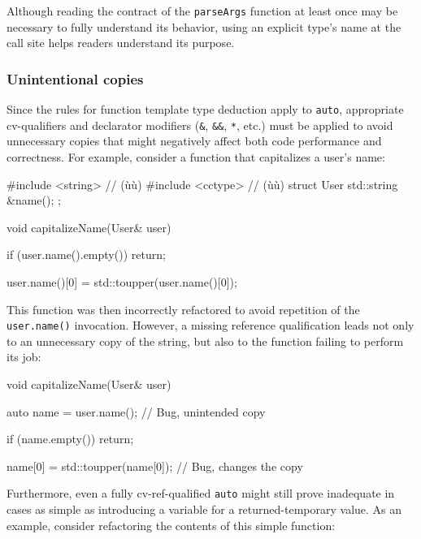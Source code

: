 \noindent Although reading the contract of the \lstinline!parseArgs!
function at least once may be necessary to fully understand its behavior, using an
explicit type's name at the call site helps readers understand its
purpose.

\subsubsection[Unintentional copies]{Unintentional copies}\label{unintentional-copies}

Since the rules for function template type deduction apply to
\lstinline!auto!, appropriate cv-qualifiers and declarator modifiers
(\lstinline!&!, \lstinline!&&!, \lstinline!*!, etc.) must be applied to avoid
unnecessary copies that might negatively affect both code performance
and correctness. For example, consider a function that capitalizes a
user's name:

\begin{emcppshiddenlisting}[emcppsbatch={e13,e14}]
#include <string>  // (ù{}ù)
#include <cctype>  // (ù{}ù)
struct User {
   std::string &name();
};
\end{emcppshiddenlisting}
\begin{emcppslisting}[emcppsbatch=e13]
void capitalizeName(User& user)
{
    if (user.name().empty())
    {
        return;
    }

    user.name()[0] = std::toupper(user.name()[0]);
}
\end{emcppslisting}

\noindent This function was then incorrectly refactored to avoid repetition of
the \lstinline!user.name()! invocation. However, a missing reference
qualification leads not only to an unnecessary copy of the string, but
also to the function failing to perform its job:

\begin{emcppslisting}[emcppsbatch=e14]
void capitalizeName(User& user)
{
    auto name = user.name();  // Bug, unintended copy

    if (name.empty())
    {
         return;
    }

    name[0] = std::toupper(name[0]);  // Bug, changes the copy
}
\end{emcppslisting}

\noindent Furthermore, even a fully cv-ref-qualified \lstinline!auto! might still
prove inadequate in cases as simple as introducing a variable for a
returned-temporary value. As an example, consider refactoring the
contents of this simple function:

